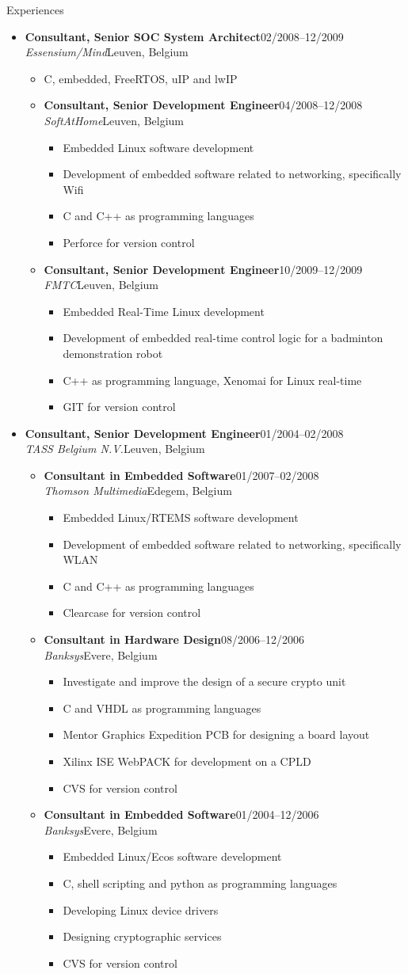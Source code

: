 \documentclass[12pt,oneside]{article}
\newenvironment{ressection}[1]{
	\vspace{5pt}
	{\selectfont\Large#1}
	\begin{itemize}
	\vspace{5pt}
}{
	\end{itemize}
}
\newcommand{\ressubitem}[1]{
	\vspace{-4pt}
	\item \begin{flushleft} #1 \end{flushleft}
}
\newcommand{\resbigitem}[4]{
	\vspace{-5pt}
	\item
	\textbf{#1}\hfill#4 \\
	\textit{#2}\hfill#3
}
\newenvironment{ressubsec}[4]{
	\resbigitem{#1}{#2}{#3}{#4}
	\vspace{-2pt}
	\begin{itemize}
}{
	\end{itemize}
}
\newenvironment{ressubsubsec}[4]{
	\vspace{5pt}
	\resbigitem{#1}{#2}{#3}{#4}
	\begin{itemize}
}{
	\end{itemize}
}
\newcommand{\ressubsubitem}[1]{
	\vspace{-1pt}
	\item \begin{flushleft} #1 \end{flushleft}
}
\begin{document}
\begin{ressection}{Experiences}
\begin{ressubsec}{Consultant, Senior SOC System Architect}{Essensium/Mind}{Leuven, Belgium}{02/2008--12/2009}
		\ressubitem{C, embedded, FreeRTOS, uIP and lwIP}
		\begin{ressubsubsec}{Consultant, Senior Development Engineer}{SoftAtHome}{Leuven, Belgium}{04/2008--12/2008}
			\ressubsubitem{Embedded Linux software development}
			\ressubsubitem{Development of embedded software related to networking, specifically Wifi}
			\ressubsubitem{C and C++ as programming languages}
			\ressubsubitem{Perforce for version control}
		\end{ressubsubsec}
		\begin{ressubsubsec}{Consultant, Senior Development Engineer}{FMTC}{Leuven, Belgium}{10/2009--12/2009}
			\ressubsubitem{Embedded Real-Time Linux development}
			\ressubsubitem{Development of embedded real-time control logic for a badminton demonstration robot}
			\ressubsubitem{C++ as programming language, Xenomai for Linux real-time}
			\ressubsubitem{GIT for version control}
		\end{ressubsubsec}
	\end{ressubsec}
	\begin{ressubsec}{Consultant, Senior Development Engineer}{TASS Belgium N.V.}{Leuven, Belgium}{01/2004--02/2008}
		\begin{ressubsubsec}{Consultant in Embedded Software}{Thomson Multimedia}{Edegem, Belgium}{01/2007--02/2008}
			\ressubsubitem{Embedded Linux/RTEMS software development}
			\ressubsubitem{Development of embedded software related to networking, specifically WLAN}
			\ressubsubitem{C and C++ as programming languages}
			\ressubsubitem{Clearcase for version control}
		\end{ressubsubsec}
		\begin{ressubsubsec}{Consultant in Hardware Design}{Banksys}{Evere, Belgium}{08/2006--12/2006}
			\ressubsubitem{Investigate and improve the design of a secure crypto unit}
			\ressubsubitem{C and VHDL as programming languages}
			\ressubsubitem{Mentor Graphics Expedition PCB for designing a board layout}
			\ressubsubitem{Xilinx ISE WebPACK for development on a CPLD}
			\ressubsubitem{CVS for version control}
		\end{ressubsubsec}
		\begin{ressubsubsec}{Consultant in Embedded Software}{Banksys}{Evere, Belgium}{01/2004--12/2006}
			\ressubsubitem{Embedded Linux/Ecos software development}
			\ressubsubitem{C, shell scripting and python as programming languages}
			\ressubsubitem{Developing Linux device drivers}
			\ressubsubitem{Designing cryptographic services}
			\ressubsubitem{CVS for version control}

\end{ressubsubsec}
\end{ressubsec}
\end{ressection}
\end{document}
